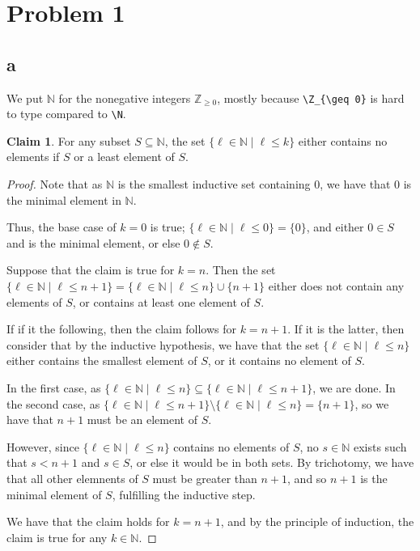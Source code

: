\documentclass[12pt,letterpaper]{article}
\theoremstyle{definition}
\newtheorem*{claim}{Claim}
\newcommand{\Z}{\mathbb{Z}}
\newcommand{\N}{\mathbb{N}}
\begin{document}
\section*{Problem 1}
\subsection*{a}

We put $\N$ for the nonegative integers $\Z_{\geq 0}$, mostly because
\verb#\Z_{\geq 0}# is hard to type compared to \verb#\N#.

\begin{claim}
    For any subset $S \subseteq \N$, the set $\{\ell \in \N \mid \ell \leq k\}$
    either contains no elements if $S$ or a least element of $S$.
\end{claim}

\begin{proof}
    Note that as $\N$ is the smallest inductive set containing $0$, 
    we have that $0$ is the minimal element in $\N$.

    Thus, the base case of $k = 0$ is true; $\{\ell \in \N \mid \ell \leq 0\} = \{0\}$, and
    either $0 \in S$ and is the minimal element, or else $0 \notin S$.

    Suppose that the claim is true for $k = n$. 
    Then the set $\{\ell \in \N \mid \ell \leq n+1\} = \{\ell \in \N \mid \ell \leq n\} \cup \{n+1\}$ 
    either does not contain any elements of $S$, or contains at least one element of $S$.

    If if it the following, then the claim follows for $k = n+1$. 
    If it is the latter, then consider that by the inductive hypothesis, we have that
    the set $\{\ell \in \N \mid \ell \leq n\}$ either contains the smallest element of $S$,
    or it contains no element of $S$. 

    In the first case, as $\{\ell \in \N \mid \ell \leq n\} \subseteq \{\ell \in \N \mid \ell \leq n+1\}$,
    we are done. In the second case, as $\{\ell \in \N \mid \ell \leq n+1\} \setminus \{\ell \in \N \mid \ell \leq n\} = \{n+1\}$,
    so we have that $n+1$ must be an element of $S$.

    However, since $\{\ell \in \N \mid \ell \leq n\}$ contains no elements of $S$,
    no $s \in \N$ exists such that $s < n+1$ and $s \in S$, or else it would be in both sets.
    By trichotomy, we have that all other elemnents of $S$ must be greater than $n+1$,
    and so $n+1$ is the minimal element of $S$, fulfilling the inductive step.

    We have that the claim holds for $k = n+1$, and by the principle of induction, 
    the claim is true for any $k \in \N$.
\end{proof}
\end{document}
